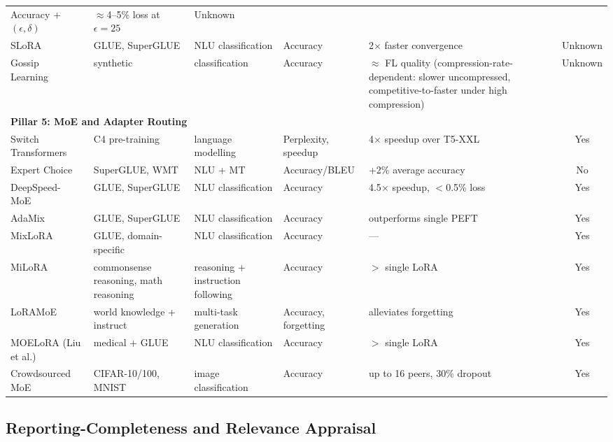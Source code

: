\begin{table}
{\begin{tabular}{lllllc}
  Accuracy + $(\epsilon,\delta)$ & $\approx$4--5\% loss at $\epsilon=25$ & Unknown \\
  SLoRA~\cite{Babakniya2023} & GLUE, SuperGLUE & NLU classification & Accuracy
  & 2$\times$ faster convergence & Unknown \\
  Gossip Learning~\cite{HegeduisGossip2019} & synthetic & classification &
  Accuracy & $\approx$ FL quality (compression-rate-dependent: slower
  uncompressed, competitive-to-faster under high compression) & Unknown \\
  \midrule
  \multicolumn{6}{l}{\textbf{Pillar 5: MoE and Adapter Routing}} \\
  Switch Transformers~\cite{Fedus2022} & C4 pre-training & language modelling &
   Perplexity, speedup & 4$\times$ speedup over T5-XXL & Yes \\
  Expert Choice~\cite{Zhou2022} & SuperGLUE, WMT & NLU + MT & Accuracy/BLEU &
  +2\% average accuracy & No \\
  DeepSpeed-MoE~\cite{RajbhandariDeepSpeed2022} & GLUE, SuperGLUE & NLU
  classification & Accuracy & 4.5$\times$ speedup, $<$0.5\% loss & Yes \\
  AdaMix~\cite{WangAdaMix2022} & GLUE, SuperGLUE & NLU classification &
  Accuracy & outperforms single PEFT & Yes \\
  MixLoRA~\cite{LiMixLoRA2024} & GLUE, domain-specific & NLU classification &
  Accuracy & --- & Yes \\
  MiLoRA~\cite{ZhangMiLoRA2024} & commonsense reasoning, math reasoning &
  reasoning + instruction following & Accuracy & $>$ single LoRA & Yes \\
  LoRAMoE~\cite{DouLoRAMoE2024} & world knowledge + instruct & multi-task
  generation & Accuracy, forgetting & alleviates forgetting & Yes \\
  MOELoRA (Liu et al.)~\cite{LiuWhenMOE2024} & medical + GLUE & NLU classification &
  Accuracy & $>$ single LoRA & Yes \\
  Crowdsourced MoE~\cite{RyabininCrowdsourced2020} & CIFAR-10/100, MNIST &
  image classification & Accuracy & up to 16 peers, 30\% dropout & Yes \\
\bottomrule
  \end{tabular}
  }
\end{table}

\subsection{Reporting-Completeness and Relevance Appraisal}
\label{sec:methodology:quality}

